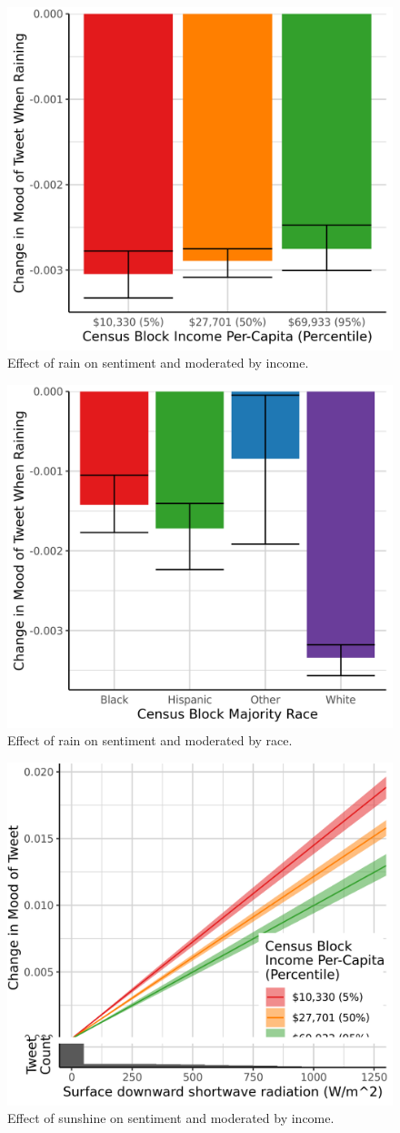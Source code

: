 \documentclass{article}
\begin{document}
\begin{figure}[H]
  \centering
  \includegraphics[width=0.6\linewidth]{../res/raining-income.png}
  \caption{Effect of rain on sentiment and moderated by income.}
  \label{fig:timeseries}
\end{figure}

\begin{figure}[H]
  \centering
  \includegraphics[width=0.6\linewidth]{../res/raining-race_q.png}
  \caption{Effect of rain on sentiment and moderated by race.}
  \label{fig:timeseries}
\end{figure}


\begin{figure}[H]
  \centering
  \includegraphics[width=0.6\linewidth]{../res/srad-income.png}
  \caption{Effect of sunshine on sentiment and moderated by income.}
  \label{fig:timeseries}
\end{figure}
\end{document}
